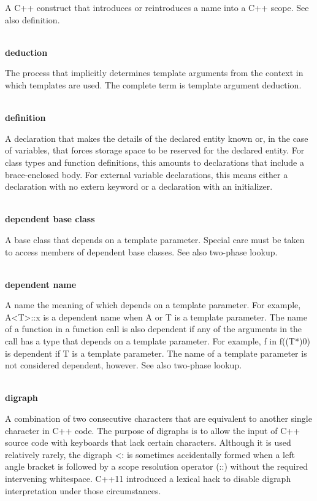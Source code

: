 A C++ construct that introduces or reintroduces a name into a C++ scope. See also definition.

\hspace*{\fill} \\ %
\noindent
\textbf{deduction}

The process that implicitly determines template arguments from the context in which templates are used. The complete term is template argument deduction.

\hspace*{\fill} \\ %
\noindent
\textbf{definition}

A declaration that makes the details of the declared entity known or, in the case of variables, that forces storage space to be reserved for the declared entity. For class types and function definitions, this amounts to declarations that include a brace-enclosed body. For external variable declarations, this means either a declaration with no extern keyword or a declaration with an initializer.

\hspace*{\fill} \\ %
\noindent
\textbf{dependent base class}

A base class that depends on a template parameter. Special care must be taken to access members of dependent base classes. See also two-phase lookup.

\hspace*{\fill} \\ %
\noindent
\textbf{dependent name}

A name the meaning of which depends on a template parameter. For example, A<T>::x is a dependent name when A or T is a template parameter. The name of a function in a function call is also dependent if any of the arguments in the call has a type that depends on a template parameter. For example, f in f((T*)0) is dependent if T is a template parameter. The name of a template parameter is not considered dependent, however. See also two-phase lookup.

\hspace*{\fill} \\ %
\noindent
\textbf{digraph}

A combination of two consecutive characters that are equivalent to another single character in C++ code. The purpose of digraphs is to allow the input of C++ source code with keyboards that lack certain characters. Although it is used relatively rarely, the digraph <: is sometimes accidentally formed when a left angle bracket is followed by a scope resolution operator (::) without the required intervening whitespace. C++11 introduced a lexical hack to disable digraph interpretation under those circumstances.

